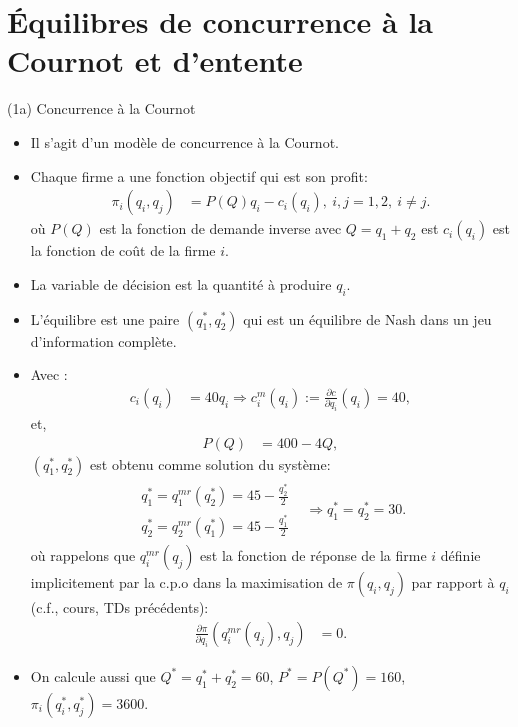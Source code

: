 \section{Équilibres de concurrence à la Cournot et d'entente}
\frame{\sectionpage}
\begin{frame}[allowframebreaks]{(1a) Concurrence à la Cournot}
\begin{itemize}
    \item Il s'agit d'un modèle de concurrence à la Cournot. 
        \item Chaque firme a une fonction objectif qui est son profit: 
        \begin{align*}
            \pi_i(q_i, q_j) &= P(Q)q_i -c_i(q_i),  \ i, j= 1, 2, \ i\neq j.
        \end{align*}
        où $P(Q)$ est la fonction de demande inverse avec $Q = q_1 + q_2$ est $c_i(q_i)$ 
        est la fonction de coût de la firme $i$.
        \item La variable de décision est la quantité à produire $q_i$. 
        \item L'équilibre est une paire $(q_1^*, q_2^*)$ qui est un équilibre de Nash dans un jeu d'information complète.
        \item Avec : 
        \begin{align*}
            c_i(q_i)&= 40 q_i \Rightarrow c^m_i(q_i) :=\frac{\partial c}{\partial q_i}(q_i) = 40,
        \end{align*}
        et,
        \begin{align*}
           P(Q) &= 400 - 4Q, 
        \end{align*}
        $(q_1^*, q_2^*)$ est obtenu comme solution du système: 
        \begin{align*}
            \begin{array}{l}
            q_1^* = q_1^{mr}(q_2^*) = 45 - \frac{q_2^*}{2}\\
            q_2^* = q_2^{mr}(q_1^*) = 45 - \frac{q_1^*}{2}
            \end{array}
            &\Rightarrow q_1^* = q_2^* = 30.
        \end{align*}
    où rappelons que $q_i^{mr}(q_j)$ est la fonction de réponse de la firme $i$ définie implicitement par la c.p.o 
    dans la maximisation de $\pi(q_i, q_j)$ par rapport à $q_i$(c.f., cours, TDs précédents): 
    \begin{align*}
        \frac{\partial \pi}{\partial q_i}\left(q_i^{mr}(q_j), q_j\right)&=0.
    \end{align*}
    \item On calcule aussi que $Q^* = q_1^* + q_2^* = 60$, $P^*=P(Q^*) = 160$,  $\pi_i(q_i^*, q_j^*) = 3600$.
\end{itemize}
\end{frame}
